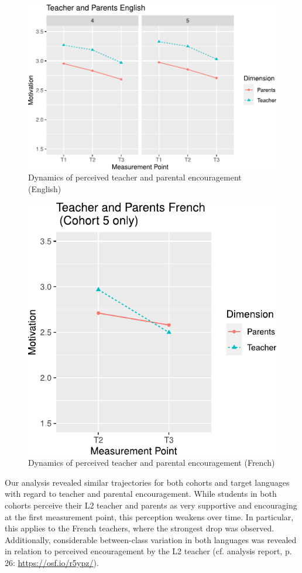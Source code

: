 \documentclass[output=paper]{langsci/langscibook}
\begin{document}
  
\begin{figure}
\includegraphics[width=\textwidth]{figures/Fig8.3.pdf}
\caption{Dynamics of perceived teacher and parental encouragement (English)\label{fig:08:3}}
\end{figure}

  
\begin{figure}
\includegraphics[width=.5\textwidth]{figures/Fig8.4.pdf}
\caption{Dynamics of perceived teacher and parental encouragement (French)\label{fig:08:4}}
\end{figure}

\begin{sloppypar}
Our analysis revealed similar trajectories for both cohorts and target languages with regard to teacher and parental encouragement. While students in both cohorts perceive their L2 teacher and parents as very supportive and encouraging at the first measurement point, this perception weakens over time. In particular, this applies to the French teachers, where the strongest drop was observed. Additionally, considerable between-class variation in both languages was revealed in relation to perceived encouragement by the L2 teacher (cf. analysis report, p. 26: \url{https://osf.io/r5ypz/}).
\end{sloppypar}
\end{document}
